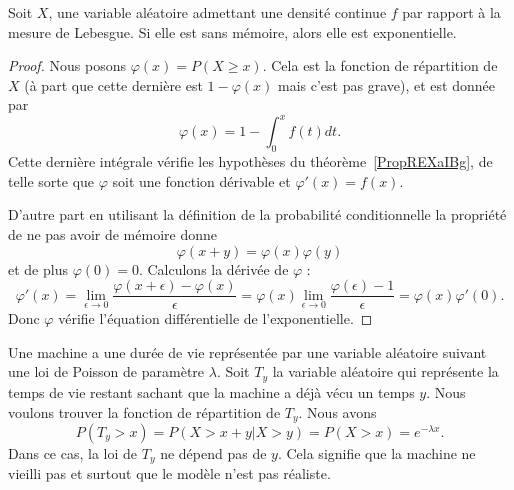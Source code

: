 \begin{proposition} \label{PropREXaIBg}
	Soit \( X\), une variable aléatoire admettant une densité continue \( f\) par rapport à la mesure de Lebesgue. Si elle est sans mémoire, alors elle est exponentielle.
\end{proposition}

\begin{proof}
	Nous posons \( \varphi(x)=P(X\geq x)\). Cela est la fonction de répartition de \( X\) (à part que cette dernière est \( 1-\varphi(x)\) mais c'est pas grave), et est donnée par
	\begin{equation}
		\varphi(x)=1-\int_0^xf(t)dt.
	\end{equation}
	Cette dernière intégrale vérifie les hypothèses du théorème~\ref{PropREXaIBg}, de telle sorte que \( \varphi\) soit une fonction dérivable et \( \varphi'(x)=f(x)\).

	D'autre part en utilisant la définition de la probabilité conditionnelle la propriété de ne pas avoir de mémoire donne
	\begin{equation}
		\varphi(x+y)=\varphi(x)\varphi(y)
	\end{equation}
	et de plus \( \varphi(0)=0\). Calculons la dérivée de \( \varphi\) :
	\begin{equation}
		\varphi'(x)=\lim_{\epsilon\to 0}\frac{ \varphi(x+\epsilon)-\varphi(x) }{ \epsilon }=\varphi(x)\lim_{\epsilon\to 0}\frac{ \varphi(\epsilon)-1 }{ \epsilon }=\varphi(x)\varphi'(0).
	\end{equation}
	Donc \( \varphi\) vérifie l'équation différentielle de l'exponentielle.

\end{proof}

\begin{example}
	Une machine a une durée de vie représentée par une variable aléatoire suivant une loi de Poisson de paramètre \( \lambda\). Soit \( T_y\) la variable aléatoire qui représente la temps de vie restant sachant que la machine a déjà vécu un temps \( y\). Nous voulons trouver la fonction de répartition de \( T_y\). Nous avons
	\begin{equation}
		P(T_y>x)=P(X>x+y|X>y)=P(X>x)= e^{-\lambda x}.
	\end{equation}
	Dans ce cas, la loi de \( T_y\) ne dépend pas de \( y\). Cela signifie que la machine ne vieilli pas et surtout que le modèle n'est pas réaliste.
\end{example}

